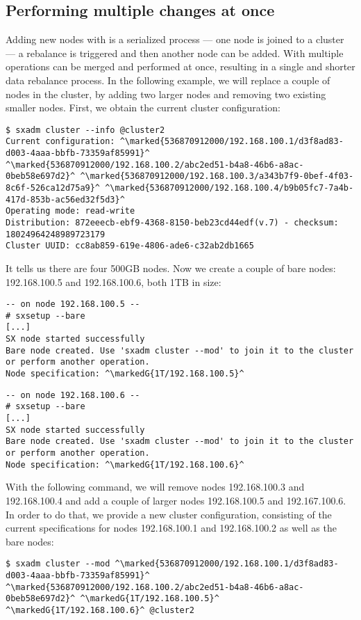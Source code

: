 \subsection{Performing multiple changes at once}
Adding new nodes with  is a serialized process --- one node is
joined to a cluster --- a rebalance is triggered and then another node can be
added. With  multiple operations can be merged
and performed at once, resulting in a single and shorter data rebalance
process. In the following example, we will replace a couple of nodes in the
cluster, by adding two larger nodes and removing two existing smaller nodes.
First, we obtain the current cluster configuration:
\begin{lstlisting}
$ sxadm cluster --info @cluster2
Current configuration: ^\marked{536870912000/192.168.100.1/d3f8ad83-d003-4aaa-bbfb-73359af85991}^ ^\marked{536870912000/192.168.100.2/abc2ed51-b4a8-46b6-a8ac-0beb58e697d2}^ ^\marked{536870912000/192.168.100.3/a343b7f9-0bef-4f03-8c6f-526ca12d75a9}^ ^\marked{536870912000/192.168.100.4/b9b05fc7-7a4b-417d-853b-ac56ed32f5d3}^
Operating mode: read-write
Distribution: 872eeecb-ebf9-4368-8150-beb23cd44edf(v.7) - checksum: 18024964248989723179
Cluster UUID: cc8ab859-619e-4806-ade6-c32ab2db1665
\end{lstlisting}
It tells us there are four 500GB nodes. Now we create a couple of bare nodes: 192.168.100.5
and 192.168.100.6, both 1TB in size:
\begin{lstlisting}
-- on node 192.168.100.5 --
# sxsetup --bare
[...]
SX node started successfully
Bare node created. Use 'sxadm cluster --mod' to join it to the cluster
or perform another operation.
Node specification: ^\markedG{1T/192.168.100.5}^
\end{lstlisting}
\begin{lstlisting}
-- on node 192.168.100.6 --
# sxsetup --bare
[...]
SX node started successfully
Bare node created. Use 'sxadm cluster --mod' to join it to the cluster
or perform another operation.
Node specification: ^\markedG{1T/192.168.100.6}^
\end{lstlisting}
With the following command, we will remove nodes 192.168.100.3 and
192.168.100.4 and add a couple of larger nodes 192.168.100.5 and
192.167.100.6. In order to do that, we provide a new cluster configuration,
consisting of the current specifications for nodes 192.168.100.1 and
192.168.100.2 as well as the bare nodes:
\begin{lstlisting}
$ sxadm cluster --mod ^\marked{536870912000/192.168.100.1/d3f8ad83-d003-4aaa-bbfb-73359af85991}^ ^\marked{536870912000/192.168.100.2/abc2ed51-b4a8-46b6-a8ac-0beb58e697d2}^ ^\markedG{1T/192.168.100.5}^ ^\markedG{1T/192.168.100.6}^ @cluster2
\end{lstlisting}
